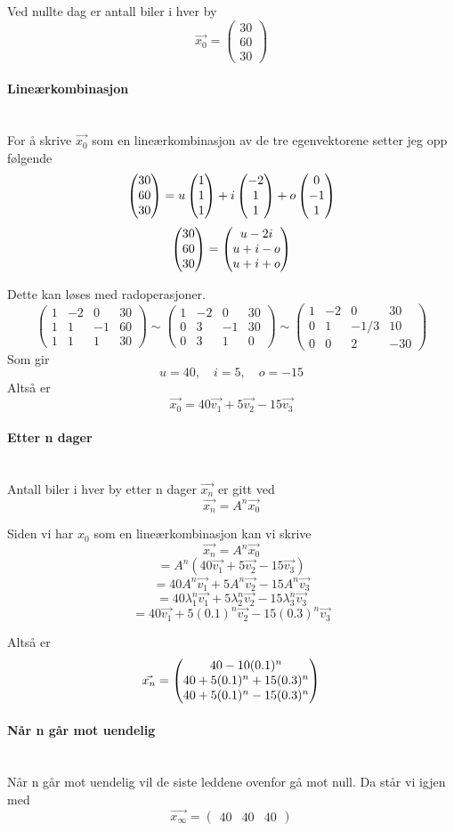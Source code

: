 Ved nullte dag er antall biler i hver by
$$\vec{x_0} = \begin{pmatrix} 30 \\ 60 \\ 30 \end{pmatrix}$$



\paragraph{Lineærkombinasjon} \mbox{} \\
For å skrive $\vec{x_0}$ som en lineærkombinasjon av de tre egenvektorene
setter jeg opp følgende
$$\begin{pmatrix} 30 \\ 60 \\ 30 \end{pmatrix}
  = u\begin{pmatrix} 1 \\ 1 \\ 1 \end{pmatrix} + i\begin{pmatrix} -2 \\ 1 \\ 1 \end{pmatrix} + o\begin{pmatrix} 0 \\ -1 \\ 1 \end{pmatrix}$$
$$\begin{pmatrix} 30 \\ 60 \\ 30 \end{pmatrix} = \begin{pmatrix} u-2i \\ u+i-o \\ u+i+o \end{pmatrix}$$

Dette kan løses med radoperasjoner.
$$\begin{pmatrix}
  1 & -2 &  0 & 30 \\
  1 &  1 & -1 & 60 \\
  1 &  1 &  1 & 30
  \end{pmatrix}
  \sim \begin{pmatrix}
       1 & -2 &  0 & 30 \\
       0 &  3 & -1 & 30 \\
       0 &  3 &  1 & 0
       \end{pmatrix}
  \sim \begin{pmatrix}
       1 & -2 &  0   & 30 \\
       0 &  1 & -1/3 & 10 \\
       0 &  0 &  2   & -30
       \end{pmatrix}$$
Som gir $$u=40, \quad i=5, \quad o=-15$$
Altså er $$\vec{x_0} = 40\vec{v_1} + 5\vec{v_2} - 15\vec{v_3}$$



\paragraph{Etter n dager} \mbox{} \\
Antall biler i hver by etter n dager $\vec{x_n}$ er gitt ved
$$\vec{x_n} = A^n\vec{x_0}$$

Siden vi har $x_0$ som en lineærkombinasjon kan vi skrive
$$\vec{x_n} = A^n\vec{x_0}$$
$$= A^n(40\vec{v_1} + 5\vec{v_2} - 15\vec{v_3})$$
$$= 40A^n\vec{v_1} + 5A^n\vec{v_2} - 15A^n\vec{v_3}$$
$$= 40\lambda_1^n\vec{v_1} + 5\lambda_2^n\vec{v_2} - 15\lambda_3^n\vec{v_3}$$
$$= 40\vec{v_1} + 5(0.1)^n\vec{v_2} - 15(0.3)^n\vec{v_3}$$

Altså er
$$\vec{x_n} =
\begin{pmatrix} 40 - 10(0.1)^n \\ 40 + 5(0.1)^n + 15(0.3)^n \\ 40 + 5(0.1)^n - 15(0.3)^n \end{pmatrix}$$



\paragraph{Når n går mot uendelig} \mbox{} \\
Når n går mot uendelig vil de siste leddene ovenfor gå mot null.
Da står vi igjen med
$$\vec{x_\infty} = \begin{pmatrix} 40 & 40 & 40 \end{pmatrix}$$
